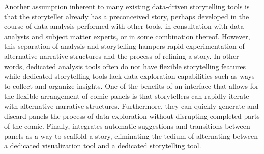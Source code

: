 Another assumption inherent to many existing data-driven storytelling tools is that the storyteller already has a preconceived story, perhaps developed in the course of data analysis performed with other tools, in consultation with data analysts and subject matter experts, or in some combination thereof.
However, this separation of analysis and storytelling hampers rapid experimentation of alternative  narrative structures and the process of refining a story. 
In other words, dedicated analysis tools often do not have flexible storytelling features while dedicated storytelling tools lack data exploration capabilities such as ways to collect and organize insights.
One of the benefits of an interface that allows for the flexible arrangement of comic panels is that storytellers can rapidly iterate with alternative narrative structures.
Furthermore, they can quickly generate and discard panels the process of data exploration without disrupting completed parts of the comic.
Finally, \toolname{} integrates automatic suggestions and transitions between panels as a way to scaffold a story, eliminating the tedium of alternating between a dedicated visualization tool and a  
dedicated storytelling tool.




